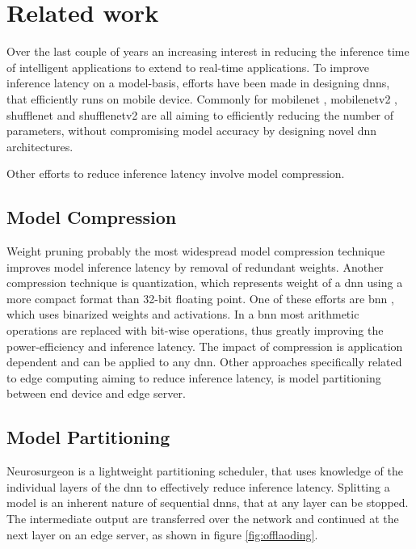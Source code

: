 \section{Related work}

Over the last couple of years an increasing interest in reducing the inference time of intelligent applications to extend to real-time applications. To improve inference latency on a model-basis, efforts have been made in designing \gls{dnn}s, that efficiently runs on mobile device. Commonly for \gls{mobilenet} \cite{howard_mobilenets:_2017}, \gls{mobilenetv2} \cite{sandler_mobilenetv2:_2018}, \gls{shufflenet} \cite{zhang_shufflenet:_2017} and \gls{shufflenetv2} \cite{ma_shufflenet_2018} are all aiming to efficiently reducing the number of parameters, without compromising model accuracy by designing novel \gls{dnn} architectures.   

Other efforts to reduce inference latency involve model compression. 

\subsection{Model Compression}

Weight pruning probably the most widespread model compression technique improves model inference latency by removal of redundant weights. Another compression technique is quantization, which represents weight of a \gls{dnn} using a more compact format than 32-bit floating point. One of these efforts are \gls{bnn} \cite{courbariaux_binarized_2016}, which uses binarized weights and activations. In a \gls{bnn} most arithmetic operations are replaced with bit-wise operations, thus greatly improving the power-efficiency and inference latency. The impact of compression is application dependent and can be applied to any \gls{dnn}. Other approaches specifically related to edge computing aiming to reduce inference latency, is model partitioning between end device and edge server. 

\subsection{Model Partitioning}

Neurosurgeon \cite{kang_neurosurgeon:_2017} is a lightweight partitioning scheduler, that uses knowledge of the individual layers of the \gls{dnn} to effectively reduce inference latency. Splitting a model is an inherent nature of sequential \gls{dnn}s, that at any layer can be stopped. The intermediate output are transferred over the network and continued at the next layer on an edge server, as shown in figure \ref{fig:offlaoding}.

